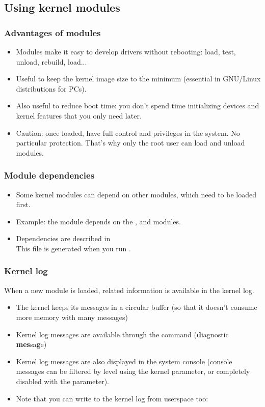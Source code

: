 \subsection{Using kernel modules}

\begin{frame}
  \frametitle{Advantages of modules}
  \begin{itemize}
  \item Modules make it easy to develop drivers without rebooting:
    load, test, unload, rebuild, load...
  \item Useful to keep the kernel image size to the minimum (essential
    in GNU/Linux distributions for PCs).
  \item Also useful to reduce boot time: you don't spend time
    initializing devices and kernel features that you only need later.
  \item Caution: once loaded, have full control and privileges in the
    system. No particular protection. That's why only the root user
    can load and unload modules.
  \end{itemize}
\end{frame}

\begin{frame}
  \frametitle{Module dependencies}
  \begin{itemize}
  \item Some kernel modules can depend on other modules,
    which need to be loaded first.
  \item Example: the  module depends on the
    ,  and  modules.
  \item Dependencies are described
    in \\
    This file is generated when you run .
  \end{itemize}
\end{frame}

\begin{frame}
  \frametitle{Kernel log}

  When a new module is loaded, related information is available in the
  kernel log.
  \begin{itemize}
  \item The kernel keeps its messages in a circular buffer (so that it
    doesn't consume more memory with many messages)
  \item Kernel log messages are available through the 
    command ({\bf d}iagnostic {\bf mes}sa{\bf g}e)
  \item Kernel log messages are also displayed in the system console
    (console messages can be filtered by level using the
     kernel parameter, or completely disabled with the
     parameter).
  \item Note that you can write to the kernel log from userspace too:\\
  \end{itemize}
\end{frame}

